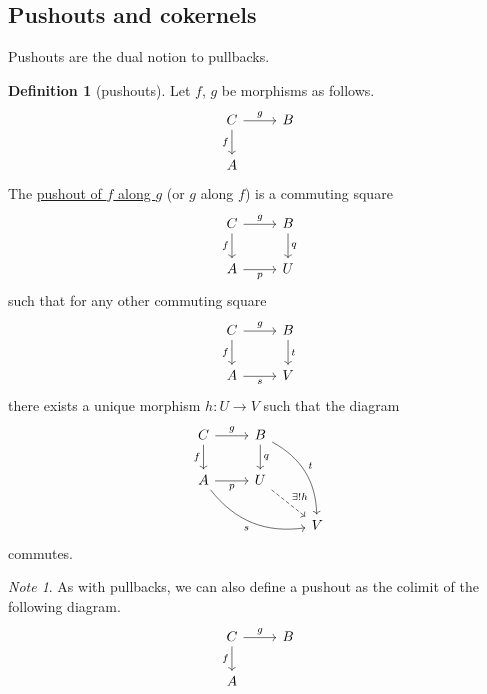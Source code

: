 \documentclass[a4paper]{report}
\newcommand{\defn}[1]{\ul{#1}}
\theoremstyle{definition}
\newtheorem{definition}{Definition}[section]
\theoremstyle{plain}
\theoremstyle{remark}
\newtheorem{note}{Note}[section]
\begin{document}
\subsection{Pushouts and cokernels}
Pushouts are the dual notion to pullbacks.
\begin{definition}[pushouts]
  \label{def:pushout}
  Let $f$, $g$ be morphisms as follows.
  \begin{equation*}
    \begin{tikzcd}
      C \arrow[r, "g"] \arrow[d, swap, "f"] & B \\
      A
    \end{tikzcd}
  \end{equation*}
  The \defn{pushout of $f$ along $g$} (or $g$ along $f$) is a commuting square
  \begin{equation*}
    \begin{tikzcd}
      C \arrow[r, "g"] \arrow[d, swap, "f"] & B \arrow[d, "q"] \\
      A \arrow[r, swap, "p"] & U
    \end{tikzcd}
  \end{equation*}
  such that for any other commuting square
  \begin{equation*}
    \begin{tikzcd}
      C \arrow[r, "g"] \arrow[d, swap, "f"] & B \arrow[d, "t"] \\
      A \arrow[r, swap, "s"] & V
    \end{tikzcd}
  \end{equation*}
  there exists a unique morphism $h\colon U \to V$ such that the diagram 
  \begin{equation*}
    \begin{tikzcd}
      C \arrow[r, "g"] \arrow[d, swap, "f"] & B \arrow[d, "q"] \arrow[ddr, bend left, "t"] & \\
      A \arrow[drr, bend right, swap, "s"] \arrow[r, swap, "p"] & U \arrow[dr, dashed, "\exists!h"] & \\
      & & V
    \end{tikzcd}
  \end{equation*}
  commutes.
\end{definition}

\begin{note}
  As with pullbacks, we can also define a pushout as the colimit of the following diagram.
  \begin{equation*}
    \begin{tikzcd}
      C \arrow[r, "g"] \arrow[d, swap, "f"] & B \\
      A
    \end{tikzcd}
  \end{equation*}
\end{note}
\end{document}
